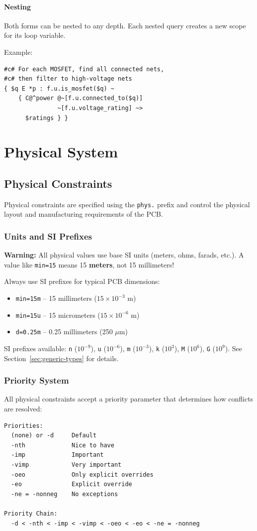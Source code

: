 \documentclass{report}
\begin{document}
\subsection{Nesting}
Both forms can be nested to any depth. Each nested query creates a new scope for its loop variable.

Example:
\begin{verbatim}
#c# For each MOSFET, find all connected nets,
#c# then filter to high-voltage nets
{ $q E *p : f.u.is_mosfet($q) ~ 
    { C@^power @~[f.u.connected_to($q)] 
               ~[f.u.voltage_rating] ~> 
      $ratings } }
\end{verbatim}\part{Physical System}
\chapter{Physical Constraints}
\label{sec:physical-constraints}
Physical constraints are specified using the \texttt{phys.} prefix and control the physical layout and manufacturing requirements of the PCB.

\section{Units and SI Prefixes}
\textbf{Warning:} All physical values use base SI units (meters, ohms, farads, etc.). A value like \texttt{min=15} means 15 \textbf{meters}, not 15 millimeters!

Always use SI prefixes for typical PCB dimensions:
\begin{itemize}
\item \texttt{min=15m} -- 15 millimeters ($15 \times 10^{-3}$ m)
\item \texttt{min=15u} -- 15 micrometers ($15 \times 10^{-6}$ m)
\item \texttt{d=0.25m} -- 0.25 millimeters (250 $\mu$m)
\end{itemize}

SI prefixes available: \texttt{n} ($10^{-9}$), \texttt{u} ($10^{-6}$), \texttt{m} ($10^{-3}$), \texttt{k} ($10^{3}$), \texttt{M} ($10^{6}$), \texttt{G} ($10^{9}$). See Section~\ref{sec:generic-types} for details.

\section{Priority System}
All physical constraints accept a priority parameter that determines how conflicts are resolved:
\begin{verbatim}
Priorities:
  (none) or -d     Default
  -nth             Nice to have
  -imp             Important
  -vimp            Very important
  -oeo             Only explicit overrides
  -eo              Explicit override
  -ne = -nonneg    No exceptions

Priority Chain: 
  -d < -nth < -imp < -vimp < -oeo < -eo < -ne = -nonneg
\end{verbatim}
\end{document}
